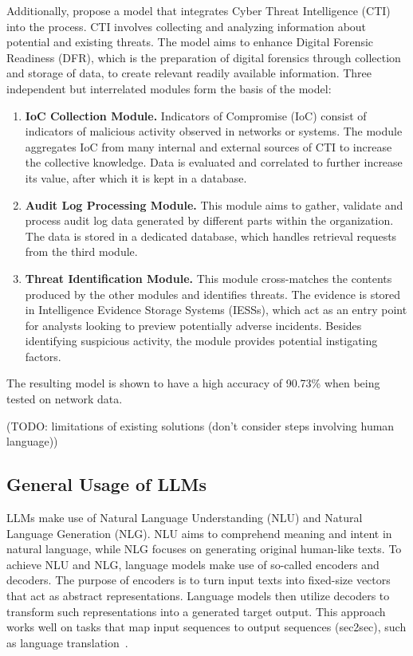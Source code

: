 Additionally, \citet{serketzis2019improving} propose a model that integrates Cyber Threat Intelligence (CTI) into the
process.
CTI involves collecting and analyzing information about potential and existing threats.
The model aims to enhance Digital Forensic Readiness (DFR), which is the preparation of digital forensics through
collection and storage of data, to create relevant readily available information.
Three independent but interrelated modules form the basis of the model:
\begin{enumerate}
    \item \textbf{IoC Collection Module.}
    Indicators of Compromise (IoC) consist of indicators of malicious activity observed in networks or systems.
    The module aggregates IoC from many internal and external sources of CTI to increase the collective knowledge.
    Data is evaluated and correlated to further increase its value, after which it is kept in a database.
    \item \textbf{Audit Log Processing Module.}
    This module aims to gather, validate and process audit log data generated by different parts within the
    organization.
    The data is stored in a dedicated database, which handles retrieval requests from the third module.
    \item \textbf{Threat Identification Module.}
    This module cross-matches the contents produced by the other modules and identifies threats.
    The evidence is stored in Intelligence Evidence Storage Systems (IESSs), which act as an entry point for analysts
    looking to preview potentially adverse incidents.
    Besides identifying suspicious activity, the module provides potential instigating factors.
\end{enumerate}
The resulting model is shown to have a high accuracy of 90.73\% when being tested on network data.

(TODO: limitations of existing solutions (don't consider steps involving human language)) %

\subsection{General Usage of LLMs}
\label{subsec:rq1-use-of-llms}

LLMs make use of Natural Language Understanding (NLU) and Natural Language Generation (NLG).
NLU aims to comprehend meaning and intent in natural language, while NLG focuses on generating original human-like
texts.
To achieve NLU and NLG, language models make use of so-called encoders and decoders.
The purpose of encoders is to turn input texts into fixed-size vectors that act as abstract representations.
Language models then utilize decoders to transform such representations into a generated target output.
This approach works well on tasks that map input sequences to output sequences (sec2sec), such as language
translation\ \citep{sutskever2014sequence, cho2014learning}.


